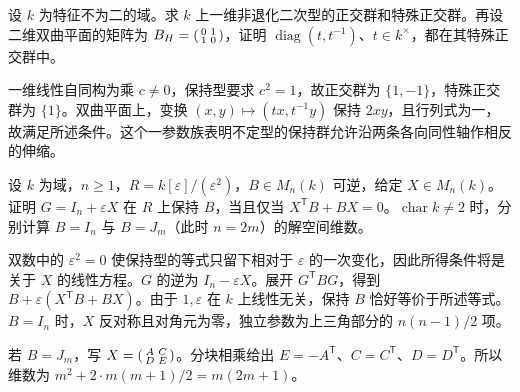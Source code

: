 \begin{exercise}\label{b2:ex:10-orthogonal-one-dimension}
	设 \(k\) 为特征不为二的域。求 \(k\) 上一维非退化二次型的正交群和特殊正交群。再设二维双曲平面的矩阵为 \(B_H=\begin{psmallmatrix}0&1\\1&0\end{psmallmatrix}\)，证明 \(\operatorname{diag}(t,t^{-1})\)、\(t\in k^\times\)，都在其特殊正交群中。
\end{exercise}
\begin{solution}
	一维线性自同构为乘 \(c\ne0\)，保持型要求 \(c^2=1\)，故正交群为 \(\{1,-1\}\)，特殊正交群为 \(\{1\}\)。双曲平面上，变换 \((x,y)\mapsto(tx,t^{-1}y)\) 保持 \(2xy\)，且行列式为一，故满足所述条件。这个一参数族表明不定型的保持群允许沿两条各向同性轴作相反的伸缩。
\end{solution}

\begin{exercise}\label{b2:ex:10-first-order-isometries}
	设 \(k\) 为域，\(n\ge1\)，\(R=k[\varepsilon]/(\varepsilon^2)\)，\(B\in M_n(k)\) 可逆，给定 \(X\in M_n(k)\)。证明 \(G=I_n+\varepsilon X\) 在 \(R\) 上保持 \(B\)，当且仅当 \(X^{\mathsf T}B+BX=0\)。\(\operatorname{char}k\ne2\) 时，分别计算 \(B=I_n\) 与 \(B=J_m\)（此时 \(n=2m\)）的解空间维数。
\end{exercise}
\begin{solution}
	双数中的 \(\varepsilon^2=0\) 使保持型的等式只留下相对于 \(\varepsilon\) 的一次变化，因此所得条件将是关于 \(X\) 的线性方程。\(G\) 的逆为 \(I_n-\varepsilon X\)。展开 \(G^{\mathsf T}BG\)，得到 \(B+\varepsilon(X^{\mathsf T}B+BX)\)。由于 \(1,\varepsilon\) 在 \(k\) 上线性无关，保持 \(B\) 恰好等价于所述等式。\(B=I_n\) 时，\(X\) 反对称且对角元为零，独立参数为上三角部分的 \(n(n-1)/2\) 项。

	若 \(B=J_m\)，写 \(X=\begin{psmallmatrix}A&C\\D&E\end{psmallmatrix}\)。分块相乘给出 \(E=-A^{\mathsf T}\)、\(C=C^{\mathsf T}\)、\(D=D^{\mathsf T}\)。所以维数为 \(m^2+2\cdot m(m+1)/2=m(2m+1)\)。
\end{solution}

